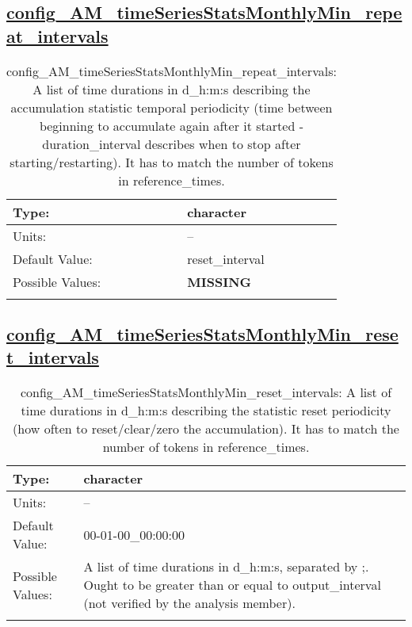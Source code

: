 \subsection[config\_AM\_timeSeriesStatsMonthlyMin\_repeat\_intervals]{\hyperref[sec:nm_tab_AM_timeSeriesStatsMonthlyMin]{config\_AM\_timeSeriesStatsMonthlyMin\_repeat\_intervals}}
\label{subsec:nm_sec_config_AM_timeSeriesStatsMonthlyMin_repeat_intervals}
\begin{center}
\begin{longtable}{| p{2.0in} || p{4.0in} |}
    \hline
    Type: & character \\
    \hline
    Units: & -- \\
    \hline
    Default Value: & reset\_interval \\
    \hline
    Possible Values: & {\bf \color{red} MISSING} \\
    \hline
    \caption{config\_AM\_timeSeriesStatsMonthlyMin\_repeat\_intervals: A list of time durations in d\_h:m:s describing the accumulation statistic temporal periodicity (time between beginning to accumulate again after it started - duration\_interval describes when to stop after starting/restarting). It has to match the number of tokens in reference\_times.}
\end{longtable}
\end{center}
\subsection[config\_AM\_timeSeriesStatsMonthlyMin\_reset\_intervals]{\hyperref[sec:nm_tab_AM_timeSeriesStatsMonthlyMin]{config\_AM\_timeSeriesStatsMonthlyMin\_reset\_intervals}}
\label{subsec:nm_sec_config_AM_timeSeriesStatsMonthlyMin_reset_intervals}
\begin{center}
\begin{longtable}{| p{2.0in} || p{4.0in} |}
    \hline
    Type: & character \\
    \hline
    Units: & -- \\
    \hline
    Default Value: & 00-01-00\_00:00:00 \\
    \hline
    Possible Values: & A list of time durations in d\_h:m:s, separated by ;. Ought to be greater than or equal to output\_interval (not verified by the analysis member). \\
    \hline
    \caption{config\_AM\_timeSeriesStatsMonthlyMin\_reset\_intervals: A list of time durations in d\_h:m:s describing the statistic reset periodicity (how often to reset/clear/zero the accumulation). It has to match the number of tokens in reference\_times.}
\end{longtable}
\end{center}
